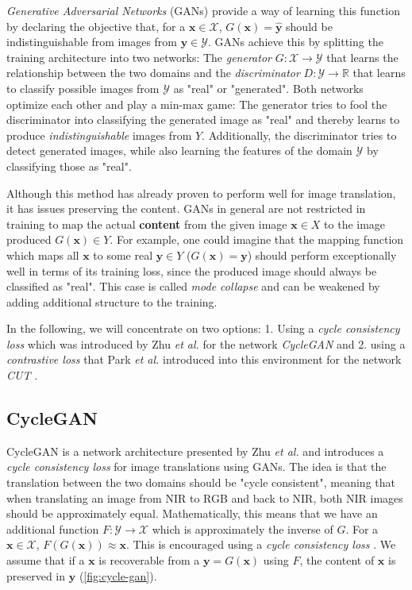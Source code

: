 \documentclass[a4paper,11pt, DIV=12]{scrartcl}
\newcommand{\x}{\boldsymbol{x}}
\newcommand{\y}{\boldsymbol{y}}
\begin{document}
\textit{Generative Adversarial Networks} (GANs) provide a way of learning this function by declaring the objective that, for a $\x \in \mathcal{X}$, $G(\x) = \hat{\y}$
should be indistinguishable from images from $\y \in \mathcal{Y}$. GANs achieve this by splitting the training architecture into two networks:
The \textit{generator} $G: \mathcal{X} \to \mathcal{Y}$ that learns the relationship between the two domains and the \textit{discriminator} $D: \mathcal{Y} \to \mathbb{R}$ that learns to
classify possible images from $\mathcal{Y}$ as "real" or "generated".
Both networks optimize each other and play a min-max game:
The generator tries to fool the discriminator into classifying the generated image as "real" and thereby learns to produce \textit{indistinguishable} images from $Y$.
Additionally, the discriminator tries to detect generated images, while also learning the features of the domain $\mathcal{Y}$ by classifying those as "real".

Although this method has already proven to perform well for image translation, it has issues preserving the content.
GANs in general are not restricted in training to map the actual \textbf{content} from the given image
$\x \in X$ to the image produced $G(\x) \in Y$.
For example, one could imagine that the mapping function which maps all $\x$ to some real $\y \in Y$ ($G(\x) = \y$) should perform exceptionally well in terms of its training loss, since the produced image should always be classified as "real".
This case is called \textit{mode collapse} and can be weakened by adding additional structure to the training.

In the following, we will concentrate on two options:
1. Using a \textit{cycle consistency loss} which was introduced by Zhu \textit{et al.} for the network \textit{CycleGAN} \cite{cyclegan_orig}
and 2. using a \textit{contrastive loss} that Park \textit{et al.} introduced into this environment for the network \textit{CUT} \cite{cut}.

\subsection{CycleGAN}
CycleGAN is a network architecture presented by Zhu \textit{et al.} and introduces a \textit{cycle consistency loss} for image translations using GANs.
The idea is that the translation between the two domains should be "cycle consistent", meaning that when translating an image from NIR to RGB and back
to NIR, both NIR images should be approximately equal.
Mathematically, this means that we have an additional function $F: \mathcal{Y} \to \mathcal{X}$ which is approximately the inverse of $G$. For a $\x \in \mathcal{X}$, $F(G(\x)) \approx \x$.
This is encouraged using a \textit{cycle consistency loss} \cite{cyclegan_orig}. We assume that if a $\x$ is recoverable from a $\y = G(\x)$ using $F$, the content of $\x$
is preserved in $\y$ \cite{cyclegan_orig} (\autoref{fig:cycle-gan}).
\end{document}
